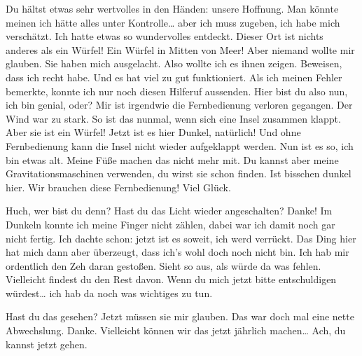 
Du hältst etwas sehr wertvolles in den Händen: unsere Hoffnung. 
Man könnte meinen ich hätte alles unter Kontrolle… aber ich muss zugeben, ich habe mich verschätzt. 
Ich hatte etwas so wundervolles entdeckt. Dieser Ort ist nichts anderes als ein Würfel! Ein Würfel in Mitten von Meer! Aber niemand wollte mir glauben. Sie haben mich ausgelacht. Also wollte ich es ihnen zeigen. Beweisen, dass ich recht habe.
Und es hat viel zu gut funktioniert. Als ich meinen Fehler bemerkte, konnte ich nur noch diesen Hilferuf aussenden. 
Hier bist du also nun, ich bin genial, oder? Mir ist irgendwie die Fernbedienung verloren gegangen. Der Wind war zu stark. So ist das nunmal, wenn sich eine Insel zusammen klappt. Aber sie ist ein Würfel!
Jetzt ist es hier Dunkel, natürlich! Und ohne Fernbedienung kann die Insel nicht wieder aufgeklappt werden. 
Nun ist es so, ich bin etwas alt. Meine Füße machen das nicht mehr mit. Du kannst aber meine Gravitationsmaschinen verwenden, du wirst sie schon finden. Ist bisschen dunkel hier. Wir brauchen diese Fernbedienung! Viel Glück.


Huch, wer bist du denn? Hast du das Licht wieder angeschalten? Danke! Im Dunkeln konnte ich meine Finger nicht zählen, dabei war ich damit noch gar nicht fertig. Ich dachte schon: jetzt ist es soweit, ich werd verrückt. 
Das Ding hier hat mich dann aber überzeugt, dass ich’s wohl doch noch nicht bin. Ich hab mir ordentlich den Zeh daran gestoßen. 
Sieht so aus, als würde da was fehlen. Vielleicht findest du den Rest davon. Wenn du mich jetzt bitte entschuldigen würdest… ich hab da noch was wichtiges zu tun.


Hast du das gesehen? Jetzt müssen sie mir glauben. Das war doch mal eine nette Abwechslung. Danke. Vielleicht können wir das jetzt jährlich machen…
Ach, du kannst jetzt gehen. 